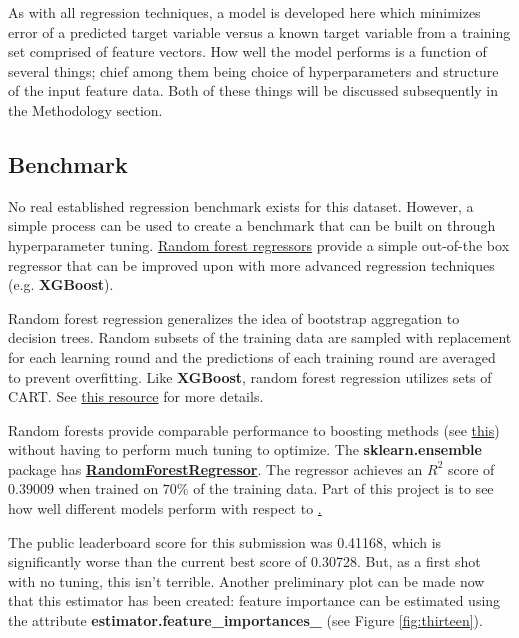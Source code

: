 \documentclass[12pt]{article}
\theoremstyle{plain} %
\theoremstyle{definition} %
\theoremstyle{remark} %
\begin{document}
As with all regression techniques, a model is developed here which minimizes error of a predicted target variable versus a known target variable from a training set comprised of feature vectors.  How well the model performs is a function of several things; chief among them being choice of hyperparameters and structure of the input feature data.  Both of these things will be discussed subsequently in the Methodology section.

\subsection*{Benchmark}
\indent \par No real established regression benchmark exists for this dataset.  However, a simple process can be used to create a benchmark that can be built on through hyperparameter tuning.  \href{http://www-bcf.usc.edu/~gareth/ISL}{Random forest regressors} provide a simple out-of-the box regressor that can be improved upon with more advanced regression techniques (e.g. \textbf{XGBoost}).  

Random forest regression generalizes the idea of bootstrap aggregation to decision trees.  Random subsets of the training data are sampled with replacement for each learning round and the predictions of each training round are averaged to prevent overfitting.  Like \textbf{XGBoost}, random forest regression utilizes sets of CART.  See \href{https://en.wikipedia.org/wiki/Random_forest}{this resource} for more details.

Random forests provide comparable performance to boosting methods (see \href{http://fastml.com/what-is-better-gradient-boosted-trees-or-random-forest/}{this}) without having to perform much tuning to optimize.  The \textbf{sklearn.ensemble} package has \href{http://scikit-learn.org/stable/modules/generated/sklearn.ensemble.RandomForestRegressor.html}{\textbf{RandomForestRegressor}}.  The regressor achieves an $R^2$ score of $0.39009$ when trained on $70\%$ of the training data.  Part of this project is to see how well different models perform with respect to \href{https://www.kaggle.com/c/sberbank-russian-housing-market/leaderboard}.

The public leaderboard score for this submission was 0.41168, which is significantly worse than the current best score of 0.30728.  But, as a first shot with no tuning, this isn't terrible.  Another preliminary plot can be made now that this estimator has been created:  feature importance can be estimated using the attribute \textbf{estimator.feature\_importances\_} (see Figure \ref{fig:thirteen}).
\end{document}
